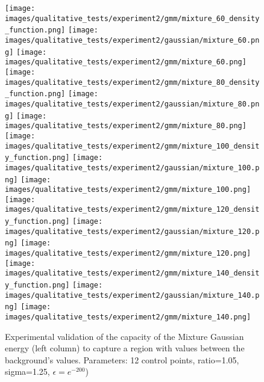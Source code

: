 \noindent
\begin{figure}[h]
	\centering
	
	\texttt{[image: images/qualitative\_tests/experiment2/gmm/mixture\_60\_density\_function.png]}\hspace{0.0\textwidth}%
	\texttt{[image: images/qualitative\_tests/experiment2/gaussian/mixture\_60.png]}\hspace{0.005\textwidth}%
	\texttt{[image: images/qualitative\_tests/experiment2/gmm/mixture\_60.png]}\\[-0.2em]
	
	\texttt{[image: images/qualitative\_tests/experiment2/gmm/mixture\_80\_density\_function.png]}\hspace{0.0\textwidth}%
	\texttt{[image: images/qualitative\_tests/experiment2/gaussian/mixture\_80.png]}\hspace{0.005\textwidth}%
	\texttt{[image: images/qualitative\_tests/experiment2/gmm/mixture\_80.png]}\\[-0.2em]
	
	\texttt{[image: images/qualitative\_tests/experiment2/gmm/mixture\_100\_density\_function.png]}\hspace{0.0\textwidth}%
	\texttt{[image: images/qualitative\_tests/experiment2/gaussian/mixture\_100.png]}\hspace{0.005\textwidth}%
	\texttt{[image: images/qualitative\_tests/experiment2/gmm/mixture\_100.png]}\\[-0.2em]
	
	
	\texttt{[image: images/qualitative\_tests/experiment2/gmm/mixture\_120\_density\_function.png]}\hspace{0.0\textwidth}%
	\texttt{[image: images/qualitative\_tests/experiment2/gaussian/mixture\_120.png]}\hspace{0.005\textwidth}%
	\texttt{[image: images/qualitative\_tests/experiment2/gmm/mixture\_120.png]}\\[-0.2em]
	
	
	\texttt{[image: images/qualitative\_tests/experiment2/gmm/mixture\_140\_density\_function.png]}\hspace{0.0\textwidth}%
	\texttt{[image: images/qualitative\_tests/experiment2/gaussian/mixture\_140.png]}\hspace{0.005\textwidth}%
	\texttt{[image: images/qualitative\_tests/experiment2/gmm/mixture\_140.png]}\\[-0.2em]
	
	\caption{Experimental validation of the capacity of the Mixture Gaussian energy (left column) to capture a region with values between the background's values. Parameters: 12 control points, ratio=1.05, sigma=1.25, $\epsilon = e^{-200}$)}
	\label{fig:mixture_robustness}
\end{figure}


